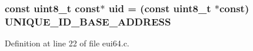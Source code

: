 \subsubsection[{\texorpdfstring{uid}{uid}}]{\setlength{\rightskip}{0pt plus 5cm}const {\bf uint8\+\_\+t} const$\ast$ uid = (const {\bf uint8\+\_\+t} $\ast$const) {\bf U\+N\+I\+Q\+U\+E\+\_\+\+I\+D\+\_\+\+B\+A\+S\+E\+\_\+\+A\+D\+D\+R\+E\+SS}}\hypertarget{iot-lab___m3_2eui64_8c_a39099710e729efb534067f3d36d7f21f}{}\label{iot-lab___m3_2eui64_8c_a39099710e729efb534067f3d36d7f21f}


Definition at line 22 of file eui64.\+c.

